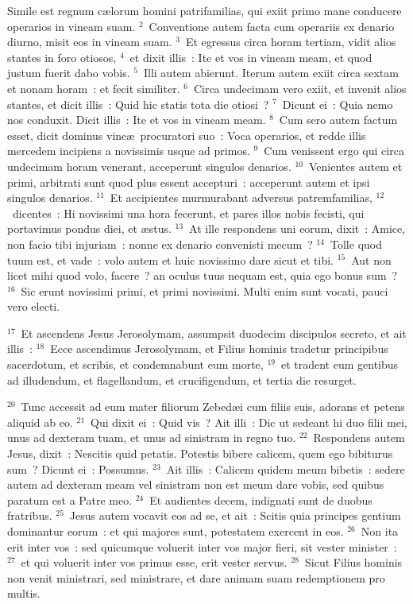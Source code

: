 \lettrine[lines=10,image=true,loversize=0.05,lraise=-0.03]{S}{}imile est regnum c\ae lorum homini patrifamilias, qui exiit primo mane conducere operarios in vineam suam.
${}^{2}$~Conventione autem facta cum operariis ex denario diurno, misit eos in vineam suam.
${}^{3}$~Et egressus circa horam tertiam, vidit alios stantes in foro otiosos,
${}^{4}$~et dixit illis~: Ite et vos in vineam meam, et quod justum fuerit dabo vobis.
${}^{5}$~Illi autem abierunt. Iterum autem exiit circa sextam et nonam horam~: et fecit similiter.
${}^{6}$~Circa undecimam vero exiit, et invenit alios stantes, et dicit illis~: Quid hic statis tota die otiosi~?
${}^{7}$~Dicunt ei~: Quia nemo nos conduxit. Dicit illis~: Ite et vos in vineam meam.
${}^{8}$~Cum sero autem factum esset, dicit dominus vine\ae\ procuratori suo~: Voca operarios, et redde illis mercedem incipiens a novissimis usque ad primos.
${}^{9}$~Cum venissent ergo qui circa undecimam horam venerant, acceperunt singulos denarios.
${}^{10}$~Venientes autem et primi, arbitrati sunt quod plus essent accepturi~: acceperunt autem et ipsi singulos denarios.
${}^{11}$~Et accipientes murmurabant adversus patremfamilias,
${}^{12}$~dicentes~: Hi novissimi una hora fecerunt, et pares illos nobis fecisti, qui portavimus pondus diei, et \ae stus.
${}^{13}$~At ille respondens uni eorum, dixit~: Amice, non facio tibi injuriam~: nonne ex denario convenisti mecum~?
${}^{14}$~Tolle quod tuum est, et vade~: volo autem et huic novissimo dare sicut et tibi.
${}^{15}$~Aut non licet mihi quod volo, facere~? an oculus tuus nequam est, quia ego bonus sum~?
${}^{16}$~Sic erunt novissimi primi, et primi novissimi. Multi enim sunt vocati, pauci vero electi.


${}^{17}$~Et ascendens Jesus Jerosolymam, assumpsit duodecim discipulos secreto, et ait illis~:
${}^{18}$~Ecce ascendimus Jerosolymam, et Filius hominis tradetur principibus sacerdotum, et scribis, et condemnabunt eum morte,
${}^{19}$~et tradent eum gentibus ad illudendum, et flagellandum, et crucifigendum, et tertia die resurget.


${}^{20}$~Tunc accessit ad eum mater filiorum Zebed\ae i cum filiis suis, adorans et petens aliquid ab eo.
${}^{21}$~Qui dixit ei~: Quid vis~? Ait illi~: Dic ut sedeant hi duo filii mei, unus ad dexteram tuam, et unus ad sinistram in regno tuo.
${}^{22}$~Respondens autem Jesus, dixit~: Nescitis quid petatis. Potestis bibere calicem, quem ego bibiturus sum~? Dicunt ei~: Possumus.
${}^{23}$~Ait illis~: Calicem quidem meum bibetis~: sedere autem ad dexteram meam vel sinistram non est meum dare vobis, sed quibus paratum est a Patre meo.
${}^{24}$~Et audientes decem, indignati sunt de duobus fratribus.
${}^{25}$~Jesus autem vocavit eos ad se, et ait~: Scitis quia principes gentium dominantur eorum~: et qui majores sunt, potestatem exercent in eos.
${}^{26}$~Non ita erit inter vos~: sed quicumque voluerit inter vos major fieri, sit vester minister~:
${}^{27}$~et qui voluerit inter vos primus esse, erit vester servus.
${}^{28}$~Sicut Filius hominis non venit ministrari, sed ministrare, et dare animam suam redemptionem pro multis.


